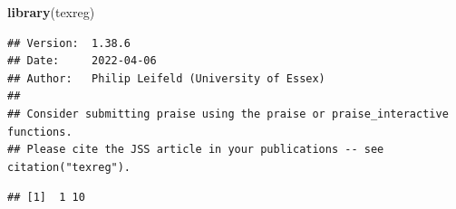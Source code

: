 \documentclass[
]{book}
\newenvironment{Shaded}{\begin{snugshade}}{\end{snugshade}}
\newcommand{\AttributeTok}[1]{\textcolor[rgb]{0.13,0.29,0.53}{#1}}
\newcommand{\CommentTok}[1]{\textcolor[rgb]{0.56,0.35,0.01}{\textit{#1}}}
\newcommand{\ConstantTok}[1]{\textcolor[rgb]{0.56,0.35,0.01}{#1}}
\newcommand{\DecValTok}[1]{\textcolor[rgb]{0.00,0.00,0.81}{#1}}
\newcommand{\FunctionTok}[1]{\textcolor[rgb]{0.13,0.29,0.53}{\textbf{#1}}}
\newcommand{\NormalTok}[1]{#1}
\newcommand{\OtherTok}[1]{\textcolor[rgb]{0.56,0.35,0.01}{#1}}
\newcommand{\SpecialCharTok}[1]{\textcolor[rgb]{0.81,0.36,0.00}{\textbf{#1}}}
\newcommand{\StringTok}[1]{\textcolor[rgb]{0.31,0.60,0.02}{#1}}
\begin{document}
\begin{Shaded}
\begin{Highlighting}[]
\FunctionTok{library}\NormalTok{(texreg)}
\end{Highlighting}
\end{Shaded}

\begin{verbatim}
## Version:  1.38.6
## Date:     2022-04-06
## Author:   Philip Leifeld (University of Essex)
## 
## Consider submitting praise using the praise or praise_interactive functions.
## Please cite the JSS article in your publications -- see citation("texreg").
\end{verbatim}

\begin{Shaded}
\end{Shaded}

\begin{verbatim}
## [1]  1 10
\end{verbatim}
\end{document}
